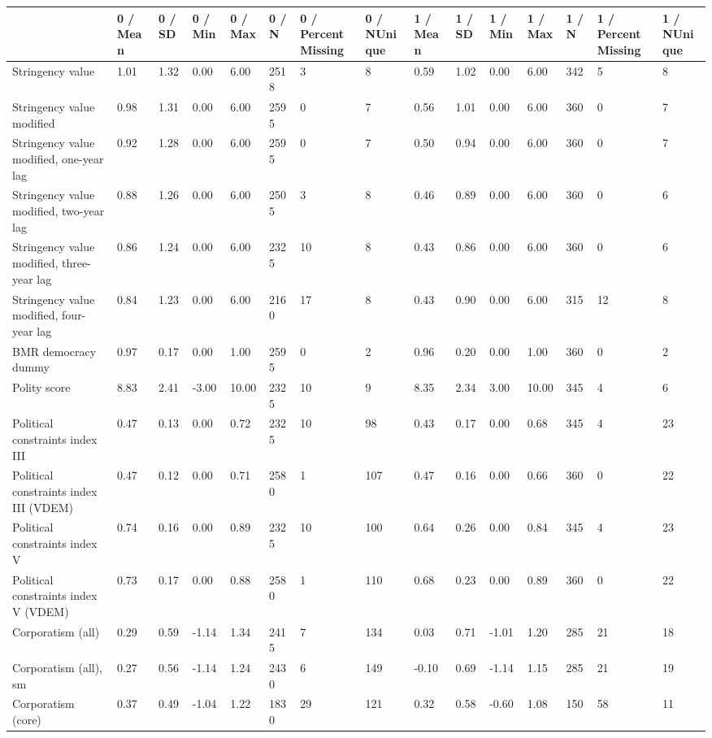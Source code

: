 
\begin{longtable}{lllllllllllllll}
\toprule
  & 0 / Mean & 0 / SD & 0 / Min & 0 / Max & 0 / N & 0 / PercentMissing & 0 / NUnique & 1 / Mean & 1 / SD & 1 / Min & 1 / Max & 1 / N & 1 / PercentMissing & 1 / NUnique\\
\midrule
Stringency value & 1.01 & 1.32 & 0.00 & 6.00 & 2518 & 3 & 8 & 0.59 & 1.02 & 0.00 & 6.00 & 342 & 5 & 8\\
Stringency value modified & 0.98 & 1.31 & 0.00 & 6.00 & 2595 & 0 & 7 & 0.56 & 1.01 & 0.00 & 6.00 & 360 & 0 & 7\\
Stringency value modified, one-year lag & 0.92 & 1.28 & 0.00 & 6.00 & 2595 & 0 & 7 & 0.50 & 0.94 & 0.00 & 6.00 & 360 & 0 & 7\\
Stringency value modified, two-year lag & 0.88 & 1.26 & 0.00 & 6.00 & 2505 & 3 & 8 & 0.46 & 0.89 & 0.00 & 6.00 & 360 & 0 & 6\\
Stringency value modified, three-year lag & 0.86 & 1.24 & 0.00 & 6.00 & 2325 & 10 & 8 & 0.43 & 0.86 & 0.00 & 6.00 & 360 & 0 & 6\\
\addlinespace
Stringency value modified, four-year lag & 0.84 & 1.23 & 0.00 & 6.00 & 2160 & 17 & 8 & 0.43 & 0.90 & 0.00 & 6.00 & 315 & 12 & 8\\
BMR democracy dummy & 0.97 & 0.17 & 0.00 & 1.00 & 2595 & 0 & 2 & 0.96 & 0.20 & 0.00 & 1.00 & 360 & 0 & 2\\
Polity score & 8.83 & 2.41 & -3.00 & 10.00 & 2325 & 10 & 9 & 8.35 & 2.34 & 3.00 & 10.00 & 345 & 4 & 6\\
Political constraints index III & 0.47 & 0.13 & 0.00 & 0.72 & 2325 & 10 & 98 & 0.43 & 0.17 & 0.00 & 0.68 & 345 & 4 & 23\\
Political constraints index III (VDEM) & 0.47 & 0.12 & 0.00 & 0.71 & 2580 & 1 & 107 & 0.47 & 0.16 & 0.00 & 0.66 & 360 & 0 & 22\\
\addlinespace
Political constraints index V & 0.74 & 0.16 & 0.00 & 0.89 & 2325 & 10 & 100 & 0.64 & 0.26 & 0.00 & 0.84 & 345 & 4 & 23\\
Political constraints index V (VDEM) & 0.73 & 0.17 & 0.00 & 0.88 & 2580 & 1 & 110 & 0.68 & 0.23 & 0.00 & 0.89 & 360 & 0 & 22\\
Corporatism (all) & 0.29 & 0.59 & -1.14 & 1.34 & 2415 & 7 & 134 & 0.03 & 0.71 & -1.01 & 1.20 & 285 & 21 & 18\\
Corporatism (all), sm & 0.27 & 0.56 & -1.14 & 1.24 & 2430 & 6 & 149 & -0.10 & 0.69 & -1.14 & 1.15 & 285 & 21 & 19\\
Corporatism (core) & 0.37 & 0.49 & -1.04 & 1.22 & 1830 & 29 & 121 & 0.32 & 0.58 & -0.60 & 1.08 & 150 & 58 & 11\\

\end{longtable}
